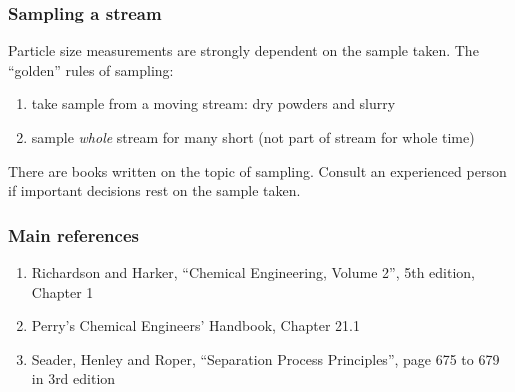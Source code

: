 \begin{comment}
\begin{frame}\frametitle{Arithmetic means}	
	\vspace{12pt}
	\[
		\overline{x} = \int_{0}^{\infty}{x f(x) dx}
	\]
	\begin{enumerate}
		\item	take the size 
	\end{enumerate}
	\begin{itemize}
		\item	Arithmetic mean
		\item	Weight or mass-mean diameter		
		\item	Volume mean diameter
		\item	Surface mean diameter (Sauter mean diameter)
	\end{itemize}
\end{frame}

\begin{frame}\frametitle{Percent passing: cut size}
	\begin{exampleblock}{Now it should be clearer}
		``powder of 75 to 90 percent passing a 200-mesh sieve''
	\end{exampleblock}
	
	\todo{show a cumulative histogram; draw a vertical line}	
\end{frame}
\end{comment}

\begin{frame}\frametitle{Sampling a stream}
	Particle size measurements are strongly dependent on the sample taken. The ``golden'' rules of sampling:
	
	\begin{enumerate}
		\item	take sample from a moving stream: dry powders and slurry
		\item	sample \emph{whole} stream for many short (not part of stream for whole time)
	\end{enumerate}
	
	\vspace{12pt}
	There are books written on the topic of sampling. Consult an experienced person if important decisions rest on the sample taken.	
\end{frame}

\begin{frame}\frametitle{Main references}
	\begin{enumerate}
		\item	Richardson and Harker, ``Chemical Engineering, Volume 2'', 5th edition, Chapter 1
		\item	Perry's Chemical Engineers' Handbook, Chapter 21.1
		\item	Seader, Henley and Roper, ``Separation Process Principles'', page 675 to 679 in 3rd edition 
	\end{enumerate}
	
	
\end{frame}